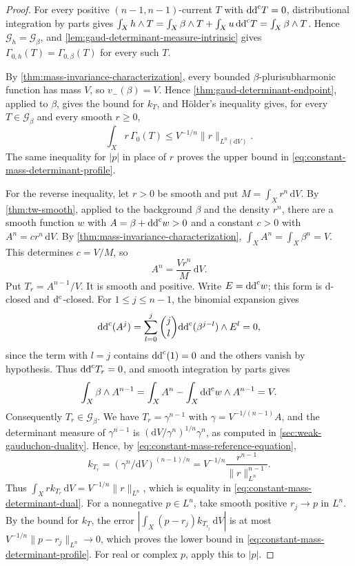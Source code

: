 \begin{proof}
For every positive $(n-1,n-1)$-current $T$ with $\mathrm{dd}^{\mathrm{c}} T=0$, distributional integration by parts gives
$\int_X h\wedge T=\int_X\beta\wedge T+\int_X u\,\mathrm{dd}^{\mathrm{c}} T
=\int_X\beta\wedge T$. Hence $\mathscr G_h=\mathscr G_\beta$, and \cref{lem:gaud-determinant-measure-intrinsic} gives $\Gamma_{0,h}(T)=\Gamma_{0,\beta}(T)$ for every such $T$.

By \cref{thm:mass-invariance-characterization}, every bounded $\beta$-plurisubharmonic function has mass $V$, so $v_-(\beta)=V$. Hence \cref{thm:gaud-determinant-endpoint}, applied to $\beta$, gives the bound for $k_T$, and H\"older's inequality gives, for every $T\in\mathscr G_\beta$ and every smooth $r\geq0$,
\begin{equation}\label{eq:constant-mass-determinant-dual}
 \int_X r\,\Gamma_0(T)\leq V^{-1/n}\|r\|_{L^n(\mathrm dV)}.
\end{equation}
The same inequality for $|p|$ in place of $r$ proves the upper bound in \eqref{eq:constant-mass-determinant-profile}.

For the reverse inequality, let $r>0$ be smooth and put $M=\int_X r^n \,\mathrm dV$. By \cref{thm:tw-smooth}, applied to the background $\beta$ and the density $r^n$, there are a smooth function $w$ with $A=\beta+\mathrm{dd}^{\mathrm{c}} w>0$ and a constant $c>0$ with $A^n=cr^n\,\mathrm dV$. By \cref{thm:mass-invariance-characterization}, $\int_XA^n=\int_X\beta^n=V$. This determines $c=V/M$, so
\begin{equation}\label{eq:constant-mass-reference-equation}
 A^n=\frac{Vr^n}{M}\,\mathrm dV.
\end{equation}
Put $T_r=A^{n-1}/V$. It is smooth and positive. Write $E=\mathrm{dd}^{\mathrm{c}} w$; this form is $\mathrm d$-closed and $\mathrm d^{\mathrm c}$-closed. For $1\leq j\leq n-1$, the binomial expansion gives
\[
 \mathrm{dd}^{\mathrm{c}}(A^j)=\sum_{l=0}^j\binom jl\mathrm{dd}^{\mathrm{c}}(\beta^{j-l})\wedge E^l=0,
\]
since the term with $l=j$ contains $\mathrm{dd}^{\mathrm{c}}(1)=0$ and the others vanish by hypothesis. Thus $\mathrm{dd}^{\mathrm{c}} T_r=0$, and smooth integration by parts gives
\[
 \int_X\beta\wedge A^{n-1}
 =\int_X A^n-\int_X\mathrm{dd}^{\mathrm{c}} w\wedge A^{n-1}=V.
\]
Consequently $T_r\in\mathscr G_\beta$.
We have $T_r=\gamma^{n-1}$ with $\gamma=V^{-1/(n-1)}A$, and the determinant measure of $\gamma^{n-1}$ is $(\mathrm dV/\gamma^n)^{1/n}\gamma^n$, as computed in \cref{sec:weak-gauduchon-duality}. Hence, by \eqref{eq:constant-mass-reference-equation},
\[
 k_{T_r}=(\gamma^n/\mathrm dV)^{(n-1)/n}
       =V^{-1/n}\frac{r^{n-1}}{\|r\|_{L^n}^{n-1}}.
\]
Thus $\int_Xrk_{T_r}\,\mathrm dV=V^{-1/n}\|r\|_{L^n}$, which is equality in \eqref{eq:constant-mass-determinant-dual}. For a nonnegative
$p\in L^n$, take smooth positive $r_j\to p$ in $L^n$. By the bound for $k_T$, the error $|\int_X(p-r_j)k_{T_{r_j}}\,\mathrm dV|$ is at most $V^{-1/n}\|p-r_j\|_{L^n}\to0$, which proves the lower
bound in \eqref{eq:constant-mass-determinant-profile}. For real or complex $p$, apply this to $|p|$.
\end{proof}
